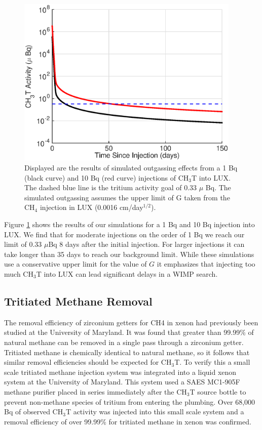 \begin{figure}[h!]
\centering
\includegraphics[width=0.95\textwidth]{fig/LUX_og_lim.eps}
\caption{Displayed are the results of simulated outgassing effects from a 1 Bq (black curve) and 10 Bq (red curve) injections of CH$_3$T into LUX. The dashed blue line is the tritium activity goal of 0.33 $\mu$ Bq. The simulated outgassing assumes the upper limit of G taken from the CH$_4$ injection in LUX (0.0016 cm/day$^{1/2}$).}
\label{fig:tau_var}
\end{figure}

Figure \ref{fig:tau_var} shows the results of our simulations for a 1 Bq and 10 Bq injection into LUX.  We find that for moderate injections on the order of 1 Bq we reach our limit of 0.33 $\mu$Bq 8 days after the initial injection.  For larger injections it can take longer than 35 days to reach our background limit.  While these simulations use a conservative upper limit for the value of $G$ it emphasizes that injecting too much CH$_3$T into LUX can lead significant delays in a WIMP search.  


\subsection{Tritiated Methane Removal}
\label{sec:RD}

The removal efficiency of zirconium getters for CH4 in xenon had previously been studied at the University of Maryland.  It was found that greater than 99.99\% of natural methane can be removed in a single pass through a zirconium getter. \cite{Dobi_CH4} Tritiated methane is chemically identical to natural methane, so it follows that similar removal efficiencies should be expected for CH$_3$T.  To verify this a small scale tritiated methane injection system was integrated into a liquid xenon system at the University of Maryland.  This system used a SAES MC1-905F methane purifier placed in series immediately after the CH$_3$T source bottle to prevent non-methane species of tritium from entering the plumbing. Over 68,000 Bq of observed CH$_3$T activity was injected into this small scale system and a removal efficiency of over 99.99\% for tritiated methane in xenon was confirmed.


